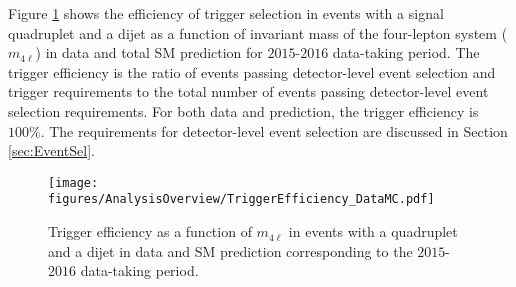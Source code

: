 Figure \ref{fig:Trigger} shows the efficiency of trigger selection in events with a signal quadruplet and a dijet as a function of invariant mass of the four-lepton system ($m_{4\ell}$) in data and total SM prediction for $2015$-$2016$ data-taking period. The trigger efficiency is the ratio of events passing detector-level event selection and trigger requirements to the total number of events passing detector-level event selection requirements. For both data and prediction, the trigger efficiency is $100\%$. The requirements for detector-level event selection are discussed in Section \ref{sec:EventSel}.

\begin{figure}[!htb]
    \centering
    \texttt{[image: figures/AnalysisOverview/TriggerEfficiency\_DataMC.pdf]}
    \caption{ Trigger efficiency as a function of $m_{4\ell}$ in events with a quadruplet and a dijet in data and SM prediction corresponding to the $2015$-$2016$ data-taking period.\label{fig:Trigger}}
\end{figure}